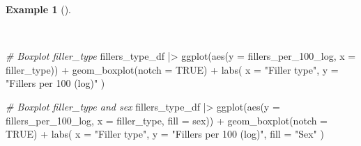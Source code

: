 \documentclass[
  letterpaper,
  DIV=11,
  numbers=noendperiod]{scrreprt}
\newenvironment{Shaded}{\begin{snugshade}}{\end{snugshade}}
\newcommand{\AttributeTok}[1]{\textcolor[rgb]{0.00,0.00,0.00}{#1}}
\newcommand{\CommentTok}[1]{\textcolor[rgb]{0.00,0.00,0.00}{\textit{#1}}}
\newcommand{\ConstantTok}[1]{\textcolor[rgb]{0.00,0.00,0.00}{#1}}
\newcommand{\FunctionTok}[1]{\textcolor[rgb]{0.00,0.00,0.00}{#1}}
\newcommand{\NormalTok}[1]{\textcolor[rgb]{0.00,0.00,0.00}{#1}}
\newcommand{\SpecialCharTok}[1]{\textcolor[rgb]{0.00,0.00,0.00}{#1}}
\newcommand{\StringTok}[1]{\textcolor[rgb]{0.00,0.00,0.00}{#1}}
\theoremstyle{definition}
\newtheorem{example}{Example}[chapter]
\theoremstyle{remark}
\begin{document}
\begin{example}[]\protect\hypertarget{exm-ida-multi-sex-plot}{}\label{exm-ida-multi-sex-plot}

~

\begin{Shaded}
\begin{Highlighting}[]
\CommentTok{\# Boxplot \textasciigrave{}filler\_type\textasciigrave{}}
\NormalTok{fillers\_type\_df }\SpecialCharTok{|\textgreater{}}
  \FunctionTok{ggplot}\NormalTok{(}\FunctionTok{aes}\NormalTok{(}\AttributeTok{y =}\NormalTok{ fillers\_per\_100\_log, }\AttributeTok{x =}\NormalTok{ filler\_type)) }\SpecialCharTok{+}
  \FunctionTok{geom\_boxplot}\NormalTok{(}\AttributeTok{notch =} \ConstantTok{TRUE}\NormalTok{) }\SpecialCharTok{+}
  \FunctionTok{labs}\NormalTok{(}
    \AttributeTok{x =} \StringTok{"Filler type"}\NormalTok{,}
    \AttributeTok{y =} \StringTok{"Fillers per 100 (log)"}
\NormalTok{  )}


\CommentTok{\# Boxplot \textasciigrave{}filler\_type\textasciigrave{} and \textasciigrave{}sex\textasciigrave{}}
\NormalTok{fillers\_type\_df }\SpecialCharTok{|\textgreater{}}
  \FunctionTok{ggplot}\NormalTok{(}\FunctionTok{aes}\NormalTok{(}\AttributeTok{y =}\NormalTok{ fillers\_per\_100\_log, }\AttributeTok{x =}\NormalTok{ filler\_type, }\AttributeTok{fill =}\NormalTok{ sex)) }\SpecialCharTok{+}
  \FunctionTok{geom\_boxplot}\NormalTok{(}\AttributeTok{notch =} \ConstantTok{TRUE}\NormalTok{) }\SpecialCharTok{+}
  \FunctionTok{labs}\NormalTok{(}
    \AttributeTok{x =} \StringTok{"Filler type"}\NormalTok{,}
    \AttributeTok{y =} \StringTok{"Fillers per 100 (log)"}\NormalTok{,}
    \AttributeTok{fill =} \StringTok{"Sex"}
\NormalTok{  )}
\end{Highlighting}
\end{Shaded}

\begin{figure}[H]

\begin{minipage}{0.50\linewidth}



\end{minipage}%
%
\begin{minipage}{0.50\linewidth}

\centering{

}
\end{minipage}
\end{figure}
\end{example}
\end{document}
